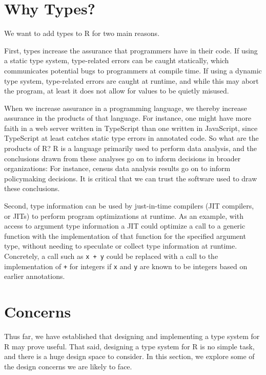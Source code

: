 \documentclass[sigplan,10pt,review]{acmart}\settopmatter{printfolios=true,printccs=false,printacmref=false}
\begin{document}
%
%
%
%
\section{Why Types?}

We want to add types to R for two main reasons.

First, types increase the assurance that programmers have in their code.
If using a static type system, type-related errors can be caught statically, which communicates potential bugs to programmers at compile time.
If using a dynamic type system, type-related errors are caught at runtime, and while this may abort the program, at least it does not allow for values to be quietly misused.

When we increase assurance in a programming language, we thereby increase assurance in the products of that language.
For instance, one might have more faith in a web server written in TypeScript than one written in JavaScript, since TypeScript at least catches static type errors in annotated code.
So what are the products of R?
R is a language primarily used to perform data analysis, and the conclusions drawn from these analyses go on to inform decisions in broader organizations:
For instance, census data analysis results go on to inform policymaking decisions.
It is critical that we can trust the software used to draw these conclusions.

Second, type information can be used by just-in-time compilers (JIT compilers, or JITs) to perform program optimizations at runtime.
As an example, with access to argument type information a JIT could optimize a call to a generic function with the implementation of that function for the specified argument type, without needing to speculate or collect type information at runtime.
Concretely, a call such as {\tt x + y} could be replaced with a call to the implementation of {\tt +} for integers if {\tt x} and {\tt y} are known to be integers based on earlier annotations.



%
%
%
%
\section{Concerns}

Thus far, we have established that designing and implementing a type system for R may prove useful.
That said, designing a type system for R is no simple task, and there is a huge design space to consider.
In this section, we explore some of the design concerns we are likely to face.
\end{document}
